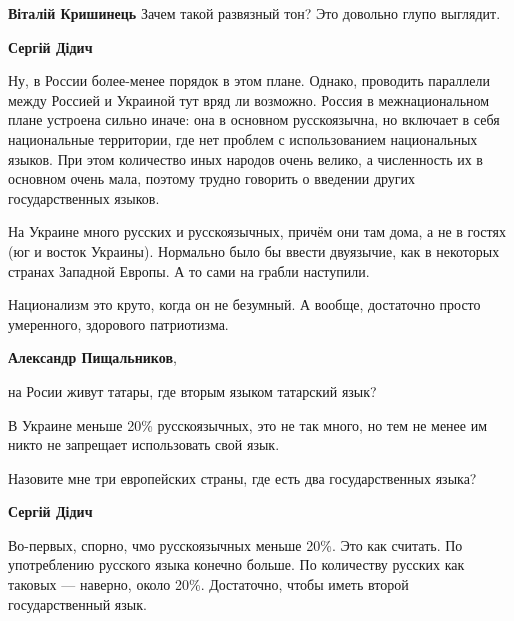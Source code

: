 \begin{itemize}
\begin{itemize}
\textbf{Віталій Кришинець} Зачем такой развязный тон? Это довольно глупо выглядит.

 
\textbf{Сергій Дідич} 

Ну, в России более-менее порядок в этом плане. Однако, проводить параллели
между Россией и Украиной тут вряд ли возможно. Россия в межнациональном плане
устроена сильно иначе: она в основном русскоязычна, но включает в себя
национальные территории, где нет проблем с использованием национальных языков.
При этом количество иных народов очень велико, а численность их в основном
очень мала, поэтому трудно говорить о введении других государственных языков.

На Украине много русских и русскоязычных, причём они там дома, а не в гостях
(юг и восток Украины). Нормально было бы ввести двуязычие, как в некоторых
странах Западной Европы. А то сами на грабли наступили.

Национализм это круто, когда он не безумный. А вообще, достаточно просто
умеренного, здорового патриотизма.

 
\textbf{Александр Пищальников}, 

на Росии живут татары, где вторым языком татарский язык?

В Украине меньше 20\% русскоязычных, это не так много, но тем не менее им никто
не запрещает использовать свой язык.

Назовите мне три европейских страны, где есть два государственных языка?

 
\textbf{Сергій Дідич} 

Во-первых, спорно, чмо русскоязычных меньше 20\%. Это как считать. По
употреблению русского языка конечно больше. По количеству русских как таковых —
наверно, около 20\%. Достаточно, чтобы иметь второй государственный язык.


\end{itemize}
\end{itemize}
